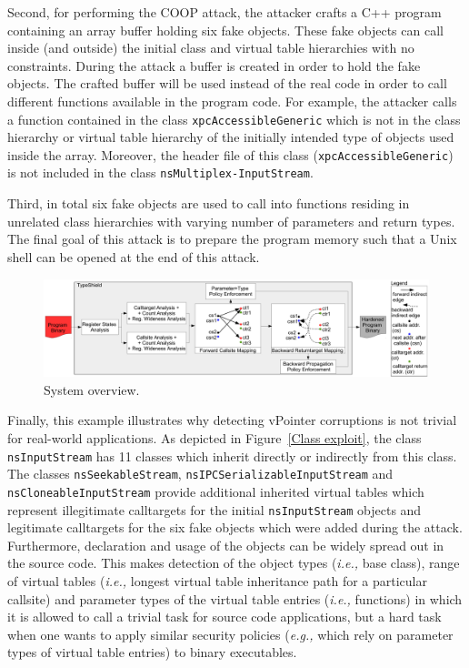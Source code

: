 Second, for performing the COOP attack, the 
attacker crafts a C++ program containing an array buffer holding six fake objects. These fake objects can call inside (and outside) 
the initial class and virtual table hierarchies with no constraints. During the attack a buffer is created in order to hold the 
fake objects. The crafted buffer will be used instead of the real code in order to call different functions available in the program code. 
For example, the attacker calls a function contained in the class \texttt{xpcAccessibleGeneric} which is not in the class 
hierarchy or virtual table hierarchy of the initially intended type of objects used inside the array. Moreover, the header 
file of this class (\texttt{xpcAccessibleGeneric}) is not included in the class \texttt{nsMultiplex-InputStream}. 

Third, in total six fake objects are used to call into functions residing in unrelated class hierarchies with varying number of parameters 
and return types. The final goal of this attack is to prepare the program memory such that a Unix shell can be opened at 
the end of this attack.

\begin{center}
\begin{figure}[t!]
\centering
   \includegraphics[width=.88\textwidth]{figures/overview.pdf}
    \caption{System overview.}
    \label{System overview.}
 \end{figure}
\end{center}

Finally, this example illustrates why detecting vPointer corruptions is not trivial for real-world applications. As depicted in 
Figure~\ref{Class exploit}, the class \texttt{nsInputStream} has 11 classes which inherit directly or indirectly from 
this class. The classes \texttt{nsSeekableStream}, \texttt{nsIPCSerializableInputStream} and \texttt{nsCloneableInputStream}
provide additional inherited virtual tables which represent illegitimate calltargets for the initial \texttt{nsInputStream} 
objects and legitimate calltargets for the six fake objects which were added during the attack. Furthermore, declaration and
usage of the objects can be widely spread out in the source code. This makes detection of the object types 
(\textit{i.e.,} base class), range of virtual tables (\textit{i.e.,} longest virtual table inheritance path for a
particular callsite) and parameter types of the virtual table entries (\textit{i.e.,} functions) in which it is 
allowed to call a trivial task for source code applications, but a hard task when one wants to apply similar 
security policies (\textit{e.g.,} which rely on parameter types of virtual table entries) to binary executables.

